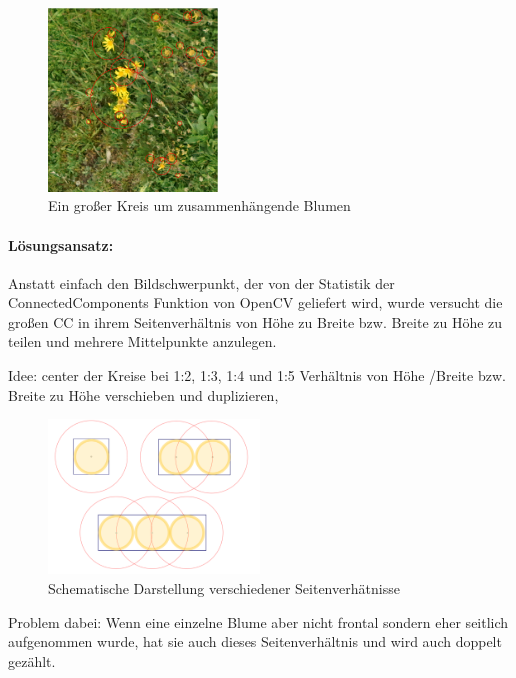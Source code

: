 \begin{figure}[htb]
 \centering
 \includegraphics[width=0.4\textwidth,angle=0]{abb/ergebnisse/probleme/bigblob}
 \caption{Ein großer Kreis um zusammenhängende Blumen}
\label{fig:Kreis}
\end{figure}

\paragraph{Lösungsansatz:}
Anstatt einfach den Bildschwerpunkt, der von der Statistik der ConnectedComponents Funktion von OpenCV geliefert wird, wurde versucht die großen CC in ihrem Seitenverhältnis von Höhe zu Breite bzw. Breite zu Höhe zu teilen und mehrere Mittelpunkte anzulegen. 

Idee: center der Kreise bei 1:2, 1:3, 1:4 und 1:5 Verhältnis von Höhe /Breite bzw. Breite zu Höhe verschieben und duplizieren,


\begin{figure}[htb]
 \centering
 \includegraphics[width=0.5\textwidth,angle=0]{abb/ergebnisse/probleme/seitenverhaeltnis}
 \caption{Schematische Darstellung verschiedener Seitenverhätnisse}
\label{fig:Schema}
\end{figure}


Problem dabei: Wenn eine einzelne Blume aber nicht frontal sondern eher seitlich aufgenommen wurde, hat sie auch dieses Seitenverhältnis und wird auch doppelt gezählt.

